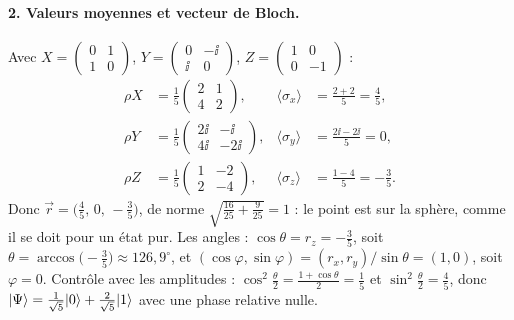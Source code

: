 \begin{correction}
\paragraph{2. Valeurs moyennes et vecteur de Bloch.} Avec $X=\begin{pmatrix}0&1\\1&0\end{pmatrix}$,
$Y=\begin{pmatrix}0&-\ii\\\ii&0\end{pmatrix}$, $Z=\begin{pmatrix}1&0\\0&-1\end{pmatrix}$ :
\begin{align*}
  \rho X&=\frac15\begin{pmatrix}2&1\\4&2\end{pmatrix}, &\langle\sigma_x\rangle&=\tfrac{2+2}{5}=\tfrac45,\\[0.8ex]
  \rho Y&=\frac15\begin{pmatrix}2\ii&-\ii\\4\ii&-2\ii\end{pmatrix}, &\langle\sigma_y\rangle&=\tfrac{2\ii-2\ii}{5}=0,\\[0.8ex]
  \rho Z&=\frac15\begin{pmatrix}1&-2\\2&-4\end{pmatrix}, &\langle\sigma_z\rangle&=\tfrac{1-4}{5}=-\tfrac35 .
\end{align*}
Donc $\vec r=\big(\tfrac45,\,0,\,-\tfrac35\big)$, de norme $\sqrt{\frac{16}{25}+\frac{9}{25}}=1$ : le point est
sur la sphère, comme il se doit pour un état pur. Les angles :
$\cos\theta=r_z=-\frac35$, soit $\theta=\arccos\!\big(-\tfrac35\big)\approx126{,}9^\circ$, et
$(\cos\varphi,\sin\varphi)=(r_x,r_y)/\sin\theta=(1,0)$, soit $\varphi=0$. Contrôle avec les amplitudes :
$\cos^2\frac\theta2=\frac{1+\cos\theta}{2}=\frac15$ et $\sin^2\frac\theta2=\frac45$, donc
$|\Psi\rangle=\frac{1}{\sqrt5}|0\rangle+\frac{2}{\sqrt5}|1\rangle$ avec une phase relative nulle.


\end{correction}
